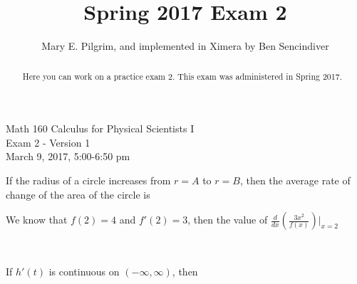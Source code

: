 \documentclass[handout]{ximera}
\author{Mary E. Pilgrim, and implemented in Ximera by Ben Sencindiver}
\title{Spring 2017 Exam 2}
\begin{document}
\begin{abstract}
  Here you can work on a practice exam 2. This exam was administered in Spring 2017.
\end{abstract}
\maketitle


\begin{center}
\Large{Math 160 Calculus for Physical Scientists I \\ Exam 2 - Version 1 \\ March 9, 2017, 5:00-6:50 pm}
\end{center}


\begin{problem}
If the radius of a circle increases from $r=A$ to $r=B$, then the average rate of change of the area of the circle is

\begin{multipleChoice}
\end{multipleChoice}
\end{problem}



\begin{problem}
We know that $f(2)=4$ and $f'(2)=3$, then the value of $\displaystyle\frac{d}{dx}\left(\frac{3x^2}{f(x)}\right)\bigg|_{x=2}$

\begin{multipleChoice}
	\\
\end{multipleChoice}
\end{problem}


\begin{problem}
If $h'(t)$ is continuous on $(-\infty,\infty)$, then 
\begin{multipleChoice}
\end{multipleChoice}
\end{problem}
\end{document}
